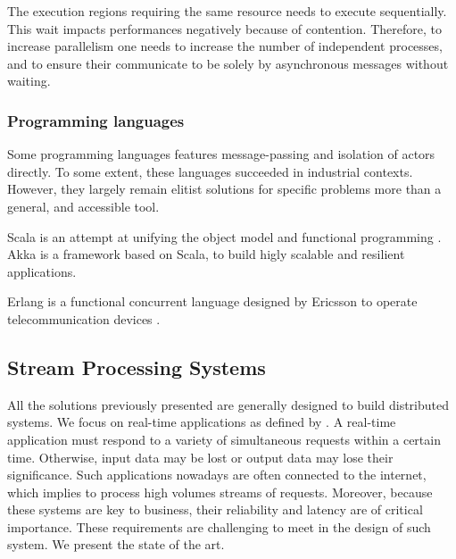 The execution regions requiring the same resource needs to execute sequentially.
This wait impacts performances negatively because of contention.
Therefore, to increase parallelism one needs to increase the number of independent processes, and to ensure their communicate to be solely by asynchronous messages without waiting.

\subsubsection{Programming languages}


Some programming languages features message-passing and isolation of actors directly.
To some extent, these languages succeeded in industrial contexts.
However, they largely remain elitist solutions for specific problems more than a general, and accessible tool.

Scala is an attempt at unifying the object model and functional programming \cite{Odersky2004}.
Akka is a framework based on Scala, to build higly scalable and resilient applications.

Erlang is a functional concurrent language designed by Ericsson to operate telecommunication devices \cite{JoeArmstrong}.

\subsection{Stream Processing Systems} \label{chapter3:parallel-execution:stream-processing}

All the solutions previously presented are generally designed to build distributed systems.
We focus on real-time applications as defined by \cite{Hansen1978}.
A real-time application must respond to a variety of simultaneous requests within a certain time.
Otherwise, input data may be lost or output data may lose their significance.
Such applications nowadays are often connected to the internet, which implies to process high volumes streams of requests.
Moreover, because these systems are key to business, their reliability and latency are of critical importance.
These requirements are challenging to meet in the design of such system.
We present the state of the art.


